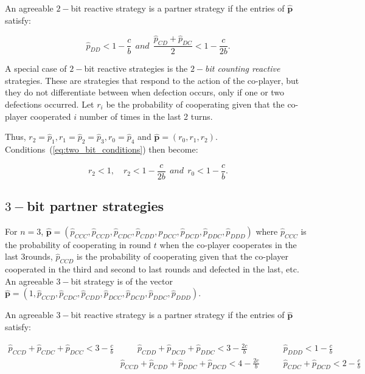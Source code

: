 \documentclass{article}
\theoremstyle{definition}
\begin{document}
An agreeable $2-$bit reactive strategy is a partner strategy if the entries of
$\mathbf{\hat{p}}$ satisfy:

\begin{equation}\label{eq:two_bit_conditions}
  \displaystyle \hat{p}_{DD} < 1\!-\! \frac{c}{b}  ~~and~~ \displaystyle \frac{\hat{p}_{CD} + \hat{p}_{DC}}{2} < 1-\frac{c}{2b}.
\end{equation}

A special case of $2-$bit reactive strategies is the {\it $2-$bit counting
reactive} strategies. These are strategies that respond to the action of the
co-player, but they do not differentiate between when defection occurs, only if
one or two defections occurred. Let \(r_i\) be the probability of cooperating
given that the co-player cooperated \(i\) number of times in the last 2 turns.

Thus, $r_2 = \hat{p}_1, r_1 = \hat{p}_2 =  \hat{p}_3, r_0 = \hat{p}_4$ and
$\mathbf{\hat{p}}=(r_0, r_1, r_2)$. Conditions~(\ref{eq:two_bit_conditions})
then become:

\begin{equation}\label{eq:counting_two_bit_conditions}
  \displaystyle r_2 < 1, \quad r_2 < 1-\frac{c}{2b} ~~and~~ r_0 < 1\!-\! \frac{c}{b}.
\end{equation}

\subsection{$3-$bit partner strategies}

For $n=3$, $\mathbf{\hat{p}}=(\hat{p}_{CCC}, \hat{p}_{CCD}, \hat{p}_{CDC},
\hat{p}_{CDD}, \hat{p}_{DCC}, \hat{p}_{DCD}, \hat{p}_{DDC}, \hat{p}_{DDD})$
where $\hat{p}_{CCC}$ is the probability of cooperating in round $t$ when the
co-player cooperates in the last 3rounds, $\hat{p}_{CCD}$ is the probability of
cooperating given that the co-player cooperated in the third and second to last
rounds and defected in the last, etc. An agreeable $3-$bit strategy is of the
vector $\mathbf{\hat{p}}=(1, \hat{p}_{CCD}, \hat{p}_{CDC}, \hat{p}_{CDD},
\hat{p}_{DCC}, \hat{p}_{DCD}, \hat{p}_{DDC}, \hat{p}_{DDD})$.

An agreeable $3-$bit reactive strategy is a partner strategy if the entries of
$\mathbf{\hat{p}}$ satisfy:

\begin{align}\label{eq:three_bit_conditions}
  \hat{p}_{CCD} + \hat{p}_{CDC} + \hat{p}_{DCC} < 3\!-\! \frac{c}{b} & \qquad 
  \hat{p}_{CDD} + \hat{p}_{DCD} + \hat{p}_{DDC} < 3\!-\! \frac{2c}{b} & \qquad 
  \hat{p}_{DDD} < 1\!-\! \frac{c}{b} \\
  & \hat{p}_{CCD} + \hat{p}_{CDD} + \hat{p}_{DDC} +  \hat{p}_{DCD}  < 4\!-\! \frac{2c}{b} 
  & \qquad \hat{p}_{CDC} + \hat{p}_{DCD} < 2\!-\! \frac{c}{b}
\end{align}
\end{document}
